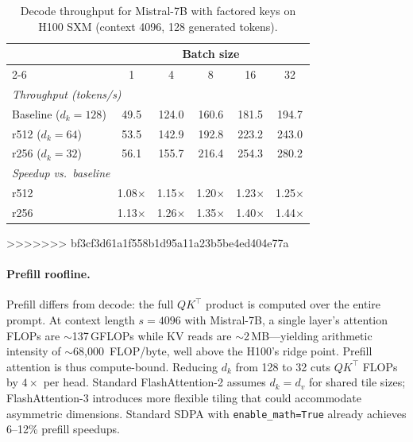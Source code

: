 \documentclass{article} %
\begin{document}
\begin{table}[h]
\centering
\caption{Decode throughput for Mistral-7B with factored keys on H100 SXM (context 4096, 128 generated tokens).}
\label{tab:decode_throughput}
\small
\begin{tabular}{lccccc}
\toprule
 & \multicolumn{5}{c}{Batch size} \\
\cmidrule(lr){2-6}
 & 1 & 4 & 8 & 16 & 32 \\
\midrule
\multicolumn{6}{l}{\emph{Throughput (tokens/s)}} \\
\quad Baseline ($d_k\!=\!128$) & 49.5 & 124.0 & 160.6 & 181.5 & 194.7 \\
\quad r512 ($d_k\!=\!64$)      & 53.5 & 142.9 & 192.8 & 223.2 & 243.0 \\
\quad r256 ($d_k\!=\!32$)      & 56.1 & 155.7 & 216.4 & 254.3 & 280.2 \\
\midrule
\multicolumn{6}{l}{\emph{Speedup vs.\ baseline}} \\
\quad r512 & 1.08$\times$ & 1.15$\times$ & 1.20$\times$ & 1.23$\times$ & 1.25$\times$ \\
\quad r256 & 1.13$\times$ & 1.26$\times$ & 1.35$\times$ & 1.40$\times$ & 1.44$\times$ \\
\bottomrule
\end{tabular}
\end{table}
>>>>>>> bf3cf3d61a1f558b1d95a11a23b5be4ed404e77a

\paragraph{Prefill roofline.}
Prefill differs from decode: the full $QK^\top$ product is computed over the entire prompt. At context length $s = 4096$ with Mistral-7B, a single layer's attention FLOPs are $\sim$137\,GFLOPs while KV reads are $\sim$2\,MB---yielding arithmetic intensity of $\sim$68{,}000~FLOP/byte, well above the H100's ridge point. Prefill attention is thus compute-bound. Reducing $d_k$ from 128 to 32 cuts $QK^\top$ FLOPs by $4\times$ per head. Standard FlashAttention-2 assumes $d_k = d_v$ for shared tile sizes; FlashAttention-3 \citep{flashattention32024} introduces more flexible tiling that could accommodate asymmetric dimensions. Standard SDPA with \texttt{enable\_math=True} already achieves 6--12\% prefill speedups.
\end{document}
